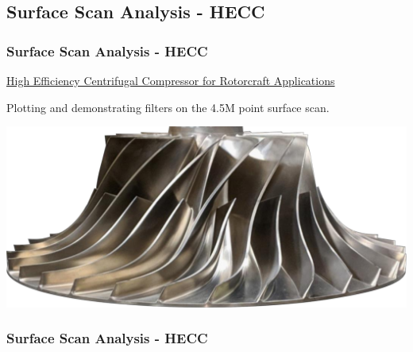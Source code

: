 \documentclass[t]{beamer}
\renewcommand{\footnotesize}{\scriptsize}
\begin{document}
\subsection{Surface Scan Analysis - HECC}
\begin{frame}

    \frametitle{Surface Scan Analysis - HECC}

    \href{https://ntrs.nasa.gov/citations/20180001471}{High Efficiency Centrifugal Compressor for Rotorcraft Applications}

    Plotting and demonstrating filters on the 4.5M point surface scan.

    \begin{center}

        \includegraphics[width=1.0\textwidth]{figures/hecc-rotor-real.png}

    \end{center}

\end{frame}

\begin{frame}

    \frametitle{Surface Scan Analysis - HECC}

    \inputminted[fontsize=\footnotesize]{python}{code/hecc-1.py}

\end{frame}
\end{document}
